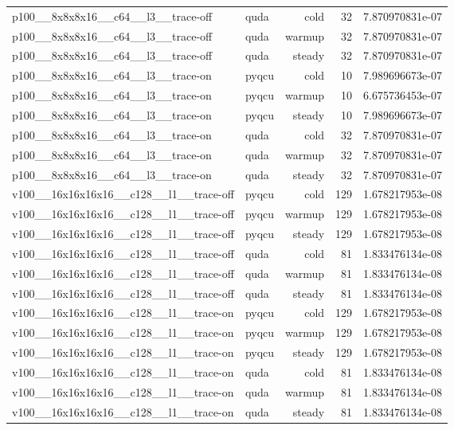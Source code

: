 \begin{table}[htbp]
\begin{tabular}{@{}llrrr@{}}
p100\_\_8x8x8x16\_\_c64\_\_l3\_\_trace-off & quda & cold & 32 & 7.870970831e-07 \\
p100\_\_8x8x8x16\_\_c64\_\_l3\_\_trace-off & quda & warmup & 32 & 7.870970831e-07 \\
p100\_\_8x8x8x16\_\_c64\_\_l3\_\_trace-off & quda & steady & 32 & 7.870970831e-07 \\
p100\_\_8x8x8x16\_\_c64\_\_l3\_\_trace-on & pyqcu & cold & 10 & 7.989696673e-07 \\
p100\_\_8x8x8x16\_\_c64\_\_l3\_\_trace-on & pyqcu & warmup & 10 & 6.675736453e-07 \\
p100\_\_8x8x8x16\_\_c64\_\_l3\_\_trace-on & pyqcu & steady & 10 & 7.989696673e-07 \\
p100\_\_8x8x8x16\_\_c64\_\_l3\_\_trace-on & quda & cold & 32 & 7.870970831e-07 \\
p100\_\_8x8x8x16\_\_c64\_\_l3\_\_trace-on & quda & warmup & 32 & 7.870970831e-07 \\
p100\_\_8x8x8x16\_\_c64\_\_l3\_\_trace-on & quda & steady & 32 & 7.870970831e-07 \\
v100\_\_16x16x16x16\_\_c128\_\_l1\_\_trace-off & pyqcu & cold & 129 & 1.678217953e-08 \\
v100\_\_16x16x16x16\_\_c128\_\_l1\_\_trace-off & pyqcu & warmup & 129 & 1.678217953e-08 \\
v100\_\_16x16x16x16\_\_c128\_\_l1\_\_trace-off & pyqcu & steady & 129 & 1.678217953e-08 \\
v100\_\_16x16x16x16\_\_c128\_\_l1\_\_trace-off & quda & cold & 81 & 1.833476134e-08 \\
v100\_\_16x16x16x16\_\_c128\_\_l1\_\_trace-off & quda & warmup & 81 & 1.833476134e-08 \\
v100\_\_16x16x16x16\_\_c128\_\_l1\_\_trace-off & quda & steady & 81 & 1.833476134e-08 \\
v100\_\_16x16x16x16\_\_c128\_\_l1\_\_trace-on & pyqcu & cold & 129 & 1.678217953e-08 \\
v100\_\_16x16x16x16\_\_c128\_\_l1\_\_trace-on & pyqcu & warmup & 129 & 1.678217953e-08 \\
v100\_\_16x16x16x16\_\_c128\_\_l1\_\_trace-on & pyqcu & steady & 129 & 1.678217953e-08 \\
v100\_\_16x16x16x16\_\_c128\_\_l1\_\_trace-on & quda & cold & 81 & 1.833476134e-08 \\
v100\_\_16x16x16x16\_\_c128\_\_l1\_\_trace-on & quda & warmup & 81 & 1.833476134e-08 \\
v100\_\_16x16x16x16\_\_c128\_\_l1\_\_trace-on & quda & steady & 81 & 1.833476134e-08 \\

\end{tabular}
\end{table}

